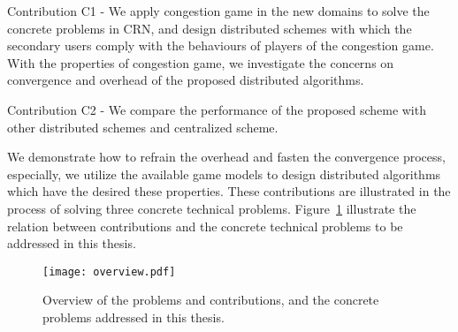 Contribution C1 - We apply congestion game in the new domains to solve the concrete problems in CRN, and design distributed schemes with which the secondary users comply with the behaviours of players of the congestion game.
With the properties of congestion game, we investigate the concerns on convergence and overhead of the proposed distributed algorithms.

Contribution C2 - We compare the performance of the proposed scheme with other distributed schemes and centralized scheme.



We demonstrate how to refrain the overhead and fasten the convergence process, especially, we utilize the available game models to design distributed algorithms which have the desired these properties.
These contributions are illustrated in the process of solving three concrete technical problems.
Figure~\ref{overview} illustrate the relation between contributions and the concrete technical problems to be addressed in this thesis.
\begin{figure}[h!]
  \centering
  \texttt{[image: overview.pdf]}
  \caption{Overview of the problems and contributions, and the concrete problems addressed in this thesis.}
\label{overview}
\end{figure}



